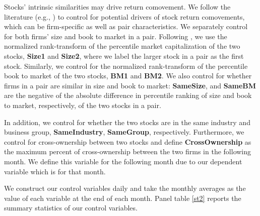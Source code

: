  Stocks' intrinsic similarities may drive return comovement. We follow the literature (e.g., \cite{AntonPolk}) to control for potential drivers of stock return comovements, which can be firm-specific as well as pair characteristics. We separately control for both firms' size and book to market in a pair. Following \cite{AntonPolk}, we use the normalized rank-transform of the percentile market capitalization of the two stocks, \textbf{Size1} and \textbf{Size2}, where we label the larger stock in a pair as the first stock. Similarly, we control for the normalized rank-transform of the percentile book to market of the two stocks, \textbf{BM1} and \textbf{BM2}. 
 We also control for whether firms in a pair are similar in size and book to market: \textbf{SameSize}, and \textbf{SameBM} are the negative of the absolute difference in percentile ranking of size and book to market, respectively, of the two stocks in a pair. 
 
 In addition, we control for whether the two stocks are in the same industry and business group, \textbf{SameIndustry}, \textbf{SameGroup}, respectively. Furthermore, we control for cross-ownership between two stocks and define  \textbf{CrossOwnership} as the maximum percent of cross-ownership between the two firms in the following month. We define this variable for the following month due to our dependent variable which is for that month.


%				



We construct our control variables daily and take the monthly averages as the value of each variable at the end of each month. Panel  table \ref{st2} reports the summary statistics of our control variables.


